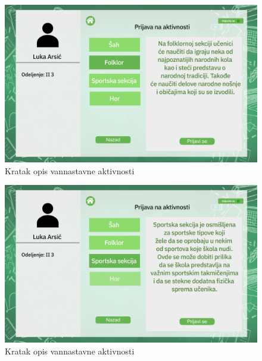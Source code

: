\documentclass{article}
\begin{document}
\begin{figure} [!ht]
    \begin{center}
        \includegraphics[scale=0.22]{../UI/Ucenik/Student_form_activity folklore.png}
    \end{center}
\caption{Kratak opis vannastavne aktivnosti}
\end{figure}

\begin{figure} [!ht]
    \begin{center}
        \includegraphics[scale=0.22]{../UI/Ucenik/Student_form_activity sport.png}
    \end{center}
\caption{Kratak opis vannastavne aktivnosti}
\end{figure}
\end{document}

